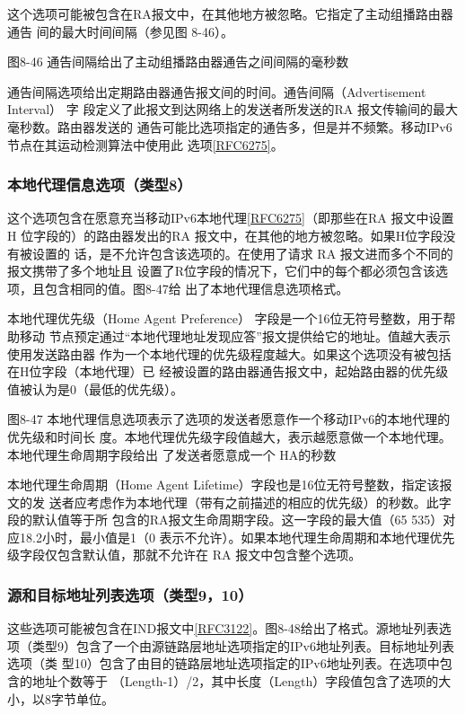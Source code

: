 这个选项可能被包含在RA报文中，在其他地方被忽略。它指定了主动组播路由器通告
间的最大时间间隔（参见图 8-46）。

图8-46 通告间隔给出了主动组播路由器通告之间间隔的毫秒数

通告间隔选项给出定期路由器通告报文间的时间。通告间隔（Advertisement Interval） 字
段定义了此报文到达网络上的发送者所发送的RA 报文传输间的最大毫秒数。路由器发送的
通告可能比选项指定的通告多，但是并不频繁。移动IPv6节点在其运动检测算法中使用此
选项\href{https://www.rfc-editor.org/rfc/rfc6275}{[RFC6275]}。

\subsubsection{本地代理信息选项（类型8）}
这个选项包含在愿意充当移动IPv6本地代理\href{https://www.rfc-editor.org/rfc/rfc6275}{[RFC6275]}（即那些在RA 报文中设置H
位字段的）的路由器发出的RA 报文中，在其他的地方被忽略。如果H位字段没有被设置的
话，是不允许包含该选项的。在使用了请求 RA 报文进而多个不同的报文携带了多个地址且
设置了R位字段的情况下，它们中的每个都必须包含该选项，且包含相同的值。图8-47给
出了本地代理信息选项格式。

本地代理优先级（Home Agent Preference） 字段是一个16位无符号整数，用于帮助移动
节点预定通过“本地代理地址发现应答”报文提供给它的地址。值越大表示使用发送路由器
作为一个本地代理的优先级程度越大。如果这个选项没有被包括在H位字段（本地代理）已
经被设置的路由器通告报文中，起始路由器的优先级值被认为是0（最低的优先级）。

图8-47 本地代理信息选项表示了选项的发送者愿意作一个移动IPv6的本地代理的优先级和时间长
度。本地代理优先级字段值越大，表示越愿意做一个本地代理。本地代理生命周期字段给出
了发送者愿意成一个 HA的秒数

本地代理生命周期（Home Agent Lifetime）字段也是16位无符号整数，指定该报文的发
送者应考虑作为本地代理（带有之前描述的相应的优先级）的秒数。此字段的默认值等于所
包含的RA报文生命周期字段。这一字段的最大值（65 535）对应18.2小时，最小值是1（0
表示不允许）。如果本地代理生命周期和本地代理优先级字段仅包含默认值，那就不允许在
RA 报文中包含整个选项。

\subsubsection{源和目标地址列表选项（类型9，10）}
这些选项可能被包含在IND报文中\href{https://www.rfc-editor.org/rfc/rfc3122}{[RFC3122]}。图8-48给出了格式。源地址列表选
项（类型9）包含了一个由源链路层地址选项指定的IPv6地址列表。目标地址列表选项（类
型10）包含了由目的链路层地址选项指定的IPv6地址列表。在选项中包含的地址个数等于
（Length-1）/2，其中长度（Length）字段值包含了选项的大小，以8字节单位。

